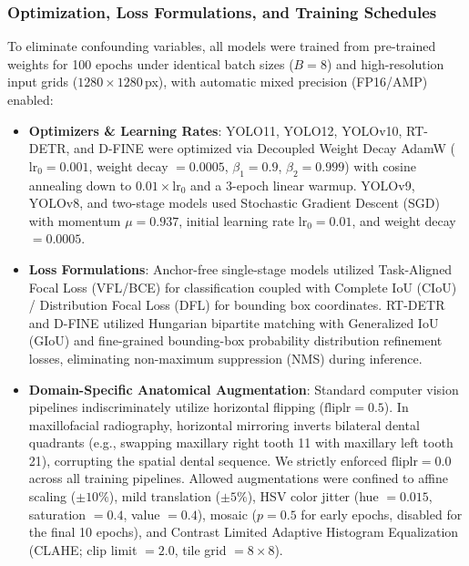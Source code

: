 \documentclass[10pt,journal,compsoc]{IEEEtran}
\begin{document}
\subsubsection{Optimization, Loss Formulations, and Training Schedules}
To eliminate confounding variables, all models were trained from pre-trained weights for 100 epochs under identical batch sizes ($B=8$) and high-resolution input grids ($1280 \times 1280$\,px), with automatic mixed precision (FP16/AMP) enabled:
\begin{itemize}
    \item \textbf{Optimizers \& Learning Rates}: YOLO11, YOLO12, YOLOv10, RT-DETR, and D-FINE were optimized via Decoupled Weight Decay AdamW ($\text{lr}_0 = 0.001$, weight decay $= 0.0005$, $\beta_1 = 0.9$, $\beta_2 = 0.999$) with cosine annealing down to $0.01 \times \text{lr}_0$ and a 3-epoch linear warmup. YOLOv9, YOLOv8, and two-stage models used Stochastic Gradient Descent (SGD) with momentum $\mu = 0.937$, initial learning rate $\text{lr}_0 = 0.01$, and weight decay $= 0.0005$.
    \item \textbf{Loss Formulations}: Anchor-free single-stage models utilized Task-Aligned Focal Loss (VFL/BCE) for classification coupled with Complete IoU (CIoU) / Distribution Focal Loss (DFL) for bounding box coordinates. RT-DETR and D-FINE utilized Hungarian bipartite matching with Generalized IoU (GIoU) and fine-grained bounding-box probability distribution refinement losses, eliminating non-maximum suppression (NMS) during inference.
    \item \textbf{Domain-Specific Anatomical Augmentation}: Standard computer vision pipelines indiscriminately utilize horizontal flipping ($\text{fliplr} = 0.5$). In maxillofacial radiography, horizontal mirroring inverts bilateral dental quadrants (e.g., swapping maxillary right tooth 11 with maxillary left tooth 21), corrupting the spatial dental sequence. We strictly enforced $\text{fliplr} = 0.0$ across all training pipelines. Allowed augmentations were confined to affine scaling ($\pm 10\%$), mild translation ($\pm 5\%$), HSV color jitter (hue $= 0.015$, saturation $= 0.4$, value $= 0.4$), mosaic ($p=0.5$ for early epochs, disabled for the final 10 epochs), and Contrast Limited Adaptive Histogram Equalization (CLAHE; clip limit $= 2.0$, tile grid $= 8 \times 8$).
\end{itemize}
\end{document}
